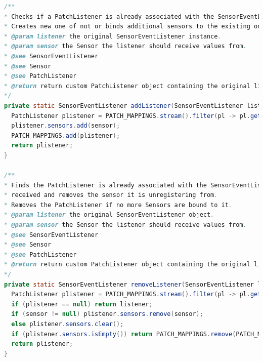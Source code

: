 \documentclass[11pt,
  oneside,openany,    %
]{scrreprt}
\begin{document}
\begin{lstlisting}[language=java, caption=Interception Helper Methods, label=lst:intercept_help_method]
/**
* Checks if a PatchListener is already associated with the SensorEventListener received.
* Creates new one of not or binds additional sensors to the existing ones.
* @param listener the original SensorEventListener instance.
* @param sensor the Sensor the listener should receive values from.
* @see SensorEventListener
* @see Sensor
* @see PatchListener
* @return return custom PatchListener object containing the original listener.
*/
private static SensorEventListener addListener(SensorEventListener listener, Sensor sensor) {
  PatchListener plistener = PATCH_MAPPINGS.stream().filter(pl -> pl.getListener().equals(listener)).findAny().orElse(new PatchListener(listener));
  plistener.sensors.add(sensor);
  PATCH_MAPPINGS.add(plistener);
  return plistener;
}

/**
* Finds the PatchListener is already associated with the SensorEventListener
* received and removes the sensor it is unregistering from.
* Removes the PatchListener if no more Sensors are bound to it.
* @param listener the original SensorEventListener object.
* @param sensor the Sensor the listener should receive values from.
* @see SensorEventListener
* @see Sensor
* @see PatchListener
* @return return custom PatchListener object containing the original listener. If none found it returns the original listener
*/
private static SensorEventListener removeListener(SensorEventListener listener, Sensor sensor) {
  PatchListener plistener = PATCH_MAPPINGS.stream().filter(pl -> pl.getListener().equals(listener)).findAny().orElse(null);
  if (plistener == null) return listener;
  if (sensor != null) plistener.sensors.remove(sensor);
  else plistener.sensors.clear();
  if (plistener.sensors.isEmpty()) return PATCH_MAPPINGS.remove(PATCH_MAPPINGS.indexOf(plistener));
  return plistener;
}
\end{lstlisting}
\end{document}
